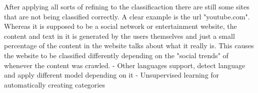 After applying all sorts of refining to the classificaction there are still some sites that are not being classified correctly. A clear example is the url "youtube.com". Whereas it is supposed to be
a social network or entertainment website, the content and text in it is generated by the users themselves and just a small percentage of the content in the website talks about what it really is.
This causes the website to be classified differently depending on the "social trends" of whenever the content was crawled.
- Other languages support, detect language and apply different model depending on it
- Unsupervised learning for automatically creating categories

